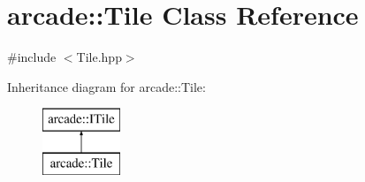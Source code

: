 \hypertarget{classarcade_1_1_tile}{\section{arcade\-:\-:Tile Class Reference}
\label{classarcade_1_1_tile}
}


{\ttfamily \#include $<$Tile.\-hpp$>$}

Inheritance diagram for arcade\-:\-:Tile\-:\begin{figure}[H]
\begin{center}
\leavevmode
\includegraphics[height=2.000000cm]{classarcade_1_1_tile}
\end{center}
\end{figure}
